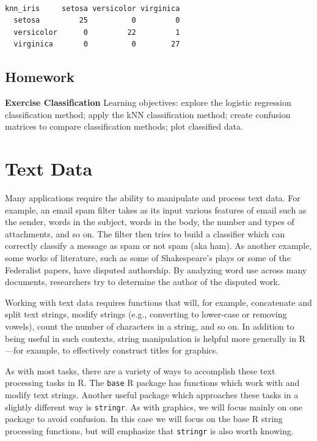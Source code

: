 \documentclass[]{krantz}
\begin{document}
\begin{verbatim}
            
knn_iris     setosa versicolor virginica
  setosa         25          0         0
  versicolor      0         22         1
  virginica       0          0        27
\end{verbatim}

\hypertarget{homework-6}{%
\section{Homework}\label{homework-6}}

\textbf{Exercise Classification} Learning objectives: explore the logistic regression classification method; apply the kNN classification method; create confusion matrices to compare classification methods; plot classified data.

\hypertarget{xml}{%
\chapter{Text Data}\label{xml}}

Many applications require the ability to manipulate and process text data. For example, an email spam filter takes as its input various features of email such as the sender, words in the subject, words in the body, the number and types of attachments, and so on. The filter then tries to build a classifier which can correctly classify a message as spam or not spam (aka ham). As another example, some works of literature, such as some of Shakespeare's plays or some of the Federalist papers, have disputed authorship. By analyzing word use across many documents, researchers try to determine the author of the disputed work.

Working with text data requires functions that will, for example, concatenate and split text strings, modify strings (e.g., converting to lower-case or removing vowels), count the number of characters in a string, and so on. In addition to being useful in such contexts, string manipulation is helpful more generally in R---for example, to effectively construct titles for graphics.

As with most tasks, there are a variety of ways to accomplish these text processing tasks in R. The \texttt{base} R package has functions which work with and modify text strings. Another useful package which approaches these tasks in a slightly different way is \texttt{stringr}. As with graphics, we will focus mainly on one package to avoid confusion. In this case we will focus on the base R string processing functions, but will emphasize that \texttt{stringr} is also worth knowing.
\end{document}

